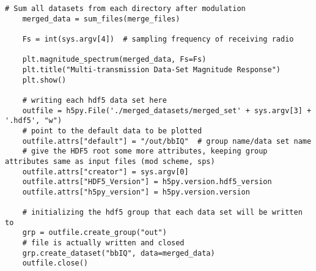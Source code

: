 \begin{lstlisting}[breaklines]
    # Sum all datasets from each directory after modulation
    merged_data = sum_files(merge_files)

    Fs = int(sys.argv[4])  # sampling frequency of receiving radio

    plt.magnitude_spectrum(merged_data, Fs=Fs)
    plt.title("Multi-transmission Data-Set Magnitude Response")
    plt.show()

    # writing each hdf5 data set here
    outfile = h5py.File('./merged_datasets/merged_set' + sys.argv[3] + '.hdf5', "w")
    # point to the default data to be plotted
    outfile.attrs["default"] = "/out/bbIQ"  # group name/data set name
    # give the HDF5 root some more attributes, keeping group attributes same as input files (mod scheme, sps)
    outfile.attrs["creator"] = sys.argv[0]
    outfile.attrs["HDF5_Version"] = h5py.version.hdf5_version
    outfile.attrs["h5py_version"] = h5py.version.version

    # initializing the hdf5 group that each data set will be written to
    grp = outfile.create_group("out")
    # file is actually written and closed
    grp.create_dataset("bbIQ", data=merged_data)
    outfile.close()
\end{lstlisting}

